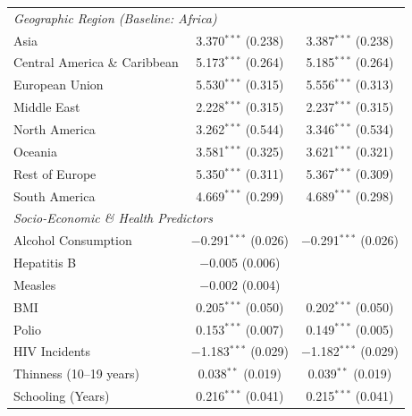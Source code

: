 \documentclass[3pt, a4paper]{article}
\begin{document}
\begin{singlespace}
\begin{longtable}{lcc}
\multicolumn{3}{l}{\textit{Geographic Region (Baseline: Africa)}} \\
\hspace{3mm} Asia & 3.370$^{***}$ (0.238) & 3.387$^{***}$ (0.238) \\ 
\hspace{3mm} Central America \& Caribbean & 5.173$^{***}$ (0.264) & 5.185$^{***}$ (0.264) \\ 
\hspace{3mm} European Union & 5.530$^{***}$ (0.315) & 5.556$^{***}$ (0.313) \\ 
\hspace{3mm} Middle East & 2.228$^{***}$ (0.315) & 2.237$^{***}$ (0.315) \\ 
\hspace{3mm} North America & 3.262$^{***}$ (0.544) & 3.346$^{***}$ (0.534) \\ 
\hspace{3mm} Oceania & 3.581$^{***}$ (0.325) & 3.621$^{***}$ (0.321) \\ 
\hspace{3mm} Rest of Europe & 5.350$^{***}$ (0.311) & 5.367$^{***}$ (0.309) \\ 
\hspace{3mm} South America & 4.669$^{***}$ (0.299) & 4.689$^{***}$ (0.298) \\ 
\midrule
\multicolumn{3}{l}{\textit{Socio-Economic \& Health Predictors}} \\
\hspace{3mm} Alcohol Consumption & $-$0.291$^{***}$ (0.026) & $-$0.291$^{***}$ (0.026) \\ 
\hspace{3mm} Hepatitis B & $-$0.005 (0.006) &  \\ 
\hspace{3mm} Measles & $-$0.002 (0.004) &  \\ 
\hspace{3mm} BMI & 0.205$^{***}$ (0.050) & 0.202$^{***}$ (0.050) \\ 
\hspace{3mm} Polio & 0.153$^{***}$ (0.007) & 0.149$^{***}$ (0.005) \\ 
\hspace{3mm} HIV Incidents & $-$1.183$^{***}$ (0.029) & $-$1.182$^{***}$ (0.029) \\ 
\hspace{3mm} Thinness (10--19 years) & 0.038$^{**}$ (0.019) & 0.039$^{**}$ (0.019) \\ 
\hspace{3mm} Schooling (Years) & 0.216$^{***}$ (0.041) & 0.215$^{***}$ (0.041) \\ 

\end{longtable}
\end{singlespace}
\end{document}
